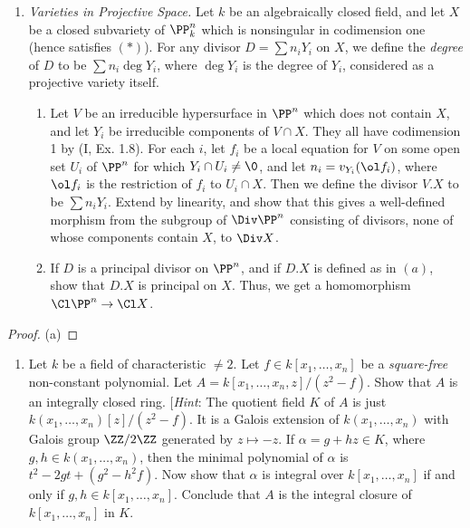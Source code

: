 \documentclass[12pt]{amsart}
\begin{document}
\begin{enumerate}
  \item[6.2.] {
      \emph{Varieties in Projective Space.} Let $k$ be an algebraically closed field, and let $X$ be a closed subvariety of $\PP^n_k$ which is nonsingular in codimension one (hence satisfies $(*)$).
      For any divisor $D=\sum n_i Y_i$ on $X$, we define the \emph{degree} of $D$ to be $\sum n_i\deg Y_i$, where $\deg Y_i$ is the degree of $Y_i$, considered as a projective variety itself.
      \begin{enumerate}
        \item Let $V$ be an irreducible hypersurface in $\PP^n$ which does not contain $X$, and let $Y_i$ be irreducible components of $V\cap X$.
          They all have codimension 1 by (I, Ex. 1.8).
          For each $i$, let $f_i$ be a local equation for $V$ on some open set $U_i$ of $\PP^n$ for which $Y_i\cap U_i\neq \0$, and let $n_i=v_{Y_i}(\ol f_i)$, where $\ol f_i$ is the restriction of $f_i$ to $U_i\cap X$.
          Then we define the divisor $V.X$ to be $\sum n_iY_i$.
          Extend by linearity, and show that this gives a well-defined morphism from the subgroup of $\Div \PP^n$ consisting of divisors, none of whose components contain $X$, to $\Div X$.
        \item If $D$ is a principal divisor on $\PP^n$, and if $D.X$ is defined as in $(a)$, show that $D.X$ is principal on $X$.
          Thus, we get a homomorphism $\Cl \PP^n\to \Cl X$.
      \end{enumerate}
    }
\end{enumerate}

\begin{proof}
  (a) 
\end{proof}

\begin{enumerate}
  \item[6.4.] {
      Let $k$ be a field of characteristic $\neq 2$.
      Let $f\in k[x_1,\ldots, x_n]$ be a \emph{square-free} non-constant polynomial.
      Let $A=k[x_1,\ldots,x_n,z]/(z^2-f)$.
      Show that $A$ is an integrally closed ring.
      [\emph{Hint}: The quotient field $K$ of $A$ is just $k(x_1,\ldots, x_n)[z]/(z^2-f)$.
      It is a Galois extension of $k(x_1,\ldots, x_n)$ with Galois group $\ZZ/2\ZZ$ generated by $z\mapsto -z$.
      If $\alpha= g+hz\in K$, where $g,h\in k(x_1,\ldots, x_n)$, then the minimal polynomial of $\alpha$ is $t^2-2gt+(g^2-h^2f)$.
      Now show that $\alpha$ is integral over $k[x_1,\ldots, x_n]$ if and only if $g,h\in k[x_1,\ldots, x_n]$.
      Conclude that $A$ is the integral closure of $k[x_1,\ldots, x_n]$ in $K$.
    }
\end{enumerate}
\end{document}
